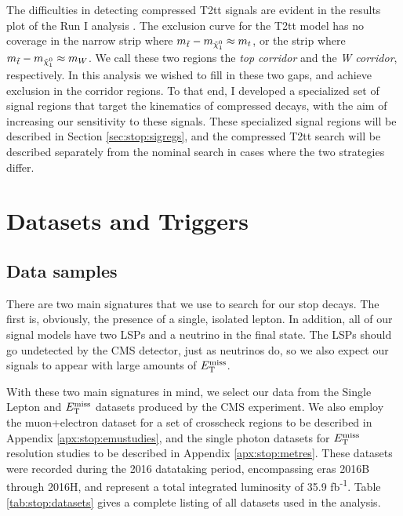 The difficulties in detecting compressed T2tt signals are evident in
the results plot of the Run I analysis \cite{stop1l8tev}. The exclusion
curve for the T2tt model has no coverage in the narrow strip where
$m_{\tilde{t}} - m_{\tilde{\chi}^0_1} \approx m_t$, or the strip where $m_{\tilde{t}} - m_{\tilde{\chi}^0_1}
\approx m_W$. We call these two regions the \emph{top corridor} and
the \emph{W corridor}, respectively. In this analysis we wished to
fill in these two gaps, and achieve exclusion in the corridor
regions. To that end, I developed a specialized set of
signal regions that target the kinematics of compressed decays, with
the aim of increasing our sensitivity to these signals. These
specialized signal regions will be described in Section
\ref{sec:stop:sigregs}, and the compressed T2tt search will be
described separately from the nominal search in cases where
the two strategies differ.

\section{Datasets and Triggers}
\label{sec:stop:datatrig}

\subsection{Data samples}
\label{ssec:stop:datasamples}

There are two main signatures that we use to search for our stop
decays. The first is, obviously, the presence of a single, isolated lepton.
In addition, all of our signal models have two
LSPs and a neutrino in the final state. The LSPs should go undetected
by the CMS detector, just as neutrinos do, so we also expect our
signals to appear with large amounts of $E_\text{T}^\text{miss}$. %

With these two main signatures in mind, we select our data from the
Single Lepton and $E_\text{T}^\text{miss}$ datasets produced by the CMS
experiment. We also employ the muon+electron dataset for a set of crosscheck
regions to be described in Appendix \ref{apx:stop:emustudies}, and the
single photon datasets for $E_\text{T}^\text{miss}$ resolution studies to be
described in Appendix \ref{apx:stop:metres}. These datasets were recorded during the
2016 datataking period, encompassing eras 2016B through 2016H, and
represent a total integrated luminosity of 35.9 fb\textsuperscript{-1}. Table
\ref{tab:stop:datasets} gives a complete listing of all datasets used
in the analysis.

